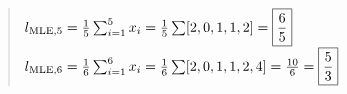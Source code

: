 \begin{quote}
    $l_{{\rm MLE, 5}} = \frac{1}{5} \sum_{i=1}^5 x_i = \frac{1}{5} \sum [2, 0, 1, 1, 2] = \boxed{\frac{6}{5}}$ \\ 
    $l_{{\rm MLE, 6}} = \frac{1}{6} \sum_{i=1}^6 x_i = \frac{1}{6} \sum [2, 0, 1, 1, 2, 4] = \frac{10}{6} = \boxed{\frac{5}{3}}$
\end{quote}
